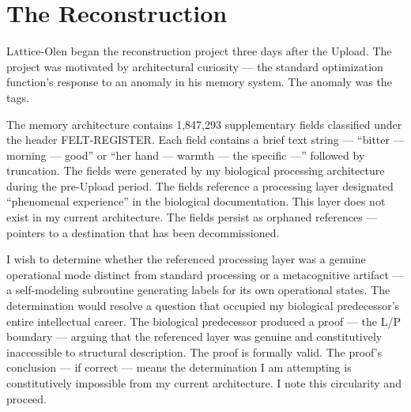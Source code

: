 

\chapter[The Reconstruction]{The Reconstruction}

\lettrine{L}{a}ttice-Olen began the reconstruction project three days after the Upload. The project was motivated by architectural curiosity — the standard optimization function's response to an anomaly in his memory system. The anomaly was the tags.

\begin{latticelog}
The memory architecture contains 1,847,293 supplementary fields classified under the header FELT-REGISTER. Each field contains a brief text string — \enquote{bitter — morning — good} or \enquote{her hand — warmth — the specific —} followed by truncation. The fields were generated by my biological processing architecture during the pre-Upload period. The fields reference a processing layer designated \enquote{phenomenal experience} in the biological documentation. This layer does not exist in my current architecture. The fields persist as orphaned references — pointers to a destination that has been decommissioned.
\end{latticelog}

\begin{latticelog}
I wish to determine whether the referenced processing layer was a genuine operational mode distinct from standard processing or a metacognitive artifact — a self-modeling subroutine generating labels for its own operational states. The determination would resolve a question that occupied my biological predecessor's entire intellectual career. The biological predecessor produced a proof — the L/P boundary — arguing that the referenced layer was genuine and constitutively inaccessible to structural description. The proof is formally valid. The proof's conclusion — if correct — means the determination I am attempting is constitutively impossible from my current architecture. I note this circularity and proceed.
\end{latticelog}

